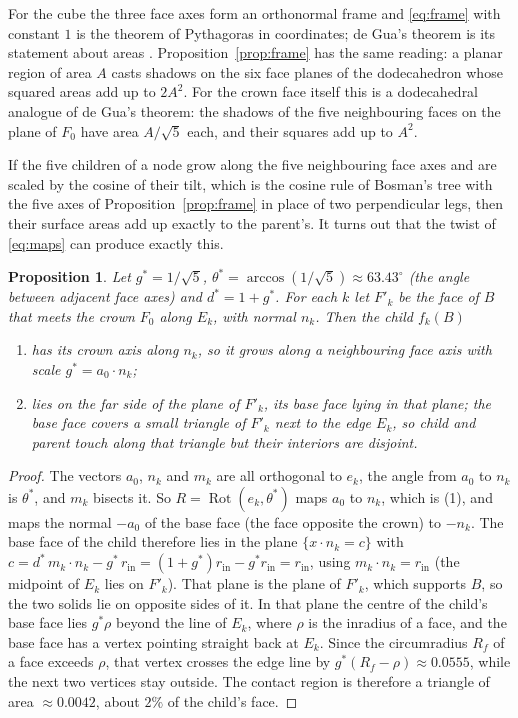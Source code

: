 \documentclass[11pt,a4paper]{article}
\newtheorem{proposition}[theorem]{Proposition}
\theoremstyle{definition}
\theoremstyle{remark}
\newcommand{\Rot}{\operatorname{Rot}}
\begin{document}
For the cube the three face axes form an orthonormal frame and
\eqref{eq:frame} with constant $1$ is the theorem of Pythagoras in coordinates;
de Gua's theorem is its statement about areas \cite{ConantBeyer1974}.
Proposition~\ref{prop:frame} has the same reading: a planar region of area $A$
casts shadows on the six face planes of the dodecahedron whose squared areas
add up to $2A^2$.  For the crown face itself this is a dodecahedral analogue
of de Gua's theorem: the shadows of the five neighbouring faces on the plane
of $F_0$ have area $A/\sqrt5$ each, and their squares add up to $A^2$.

If the five children of a node grow along the five neighbouring face axes and
are scaled by the cosine of their tilt, which is the cosine rule of Bosman's
tree with the five axes of Proposition~\ref{prop:frame} in place of two
perpendicular legs, then their surface areas add up exactly to the parent's.
It turns out that the twist of \eqref{eq:maps} can produce exactly this.

\begin{proposition}\label{prop:kiss}
Let $g^*=1/\sqrt5$, $\theta^*=\arccos(1/\sqrt5)\approx63.43^\circ$ (the angle
between adjacent face axes) and $d^*=1+g^*$.  For each $k$ let $F'_k$ be the
face of $B$ that meets the crown $F_0$ along $E_k$, with normal $n_k$.  Then
the child $f_k(B)$
\begin{enumerate}
\item has its crown axis along $n_k$, so it grows along a neighbouring face
axis with scale $g^*=a_0\cdot n_k$;
\item lies on the far side of the plane of $F'_k$, its base face lying in that
plane; the base face covers a small triangle of $F'_k$ next to the edge $E_k$,
so child and parent touch along that triangle but their interiors are disjoint.
\end{enumerate}
\end{proposition}

\begin{proof}
The vectors $a_0$, $n_k$ and $m_k$ are all orthogonal to $e_k$, the angle from
$a_0$ to $n_k$ is $\theta^*$, and $m_k$ bisects it.  So $R=\Rot(e_k,\theta^*)$
maps $a_0$ to $n_k$, which is (1), and maps the normal $-a_0$ of the base face
(the face opposite the crown) to $-n_k$.  The base face of the child therefore
lies in the plane $\{x\cdot n_k=c\}$ with
$c = d^*\,m_k\cdot n_k - g^*\,r_{\mathrm{in}} = (1+g^*)r_{\mathrm{in}}-g^*r_{\mathrm{in}}=r_{\mathrm{in}}$,
using $m_k\cdot n_k=r_{\mathrm{in}}$ (the midpoint of $E_k$ lies on $F'_k$).
That plane is the plane of $F'_k$, which supports $B$, so the two solids lie on
opposite sides of it.  In that plane the centre of the child's base face lies
$g^*\rho$ beyond the line of $E_k$, where $\rho$ is the inradius of a face,
and the base face has a vertex pointing straight back at $E_k$.  Since the
circumradius $R_f$ of a face exceeds $\rho$, that vertex crosses the edge line
by $g^*(R_f-\rho)\approx0.0555$, while the next two vertices stay outside.
The contact region is therefore a triangle of area $\approx0.0042$, about
$2\%$ of the child's face.
\end{proof}
\end{document}
